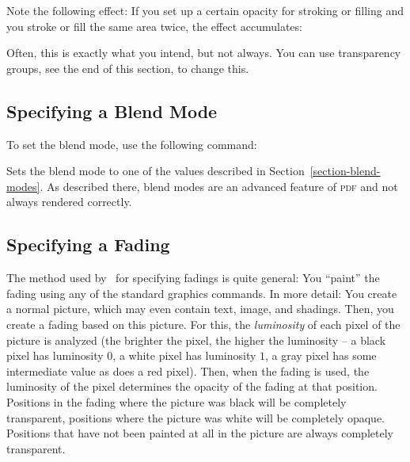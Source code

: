 Note the following effect: If you set up a certain opacity for stroking or
filling and you stroke or fill the same area twice, the effect accumulates:
%
\begin{codeexample}[]
\end{codeexample}

Often, this is exactly what you intend, but not always. You can use
transparency groups, see the end of this section, to change this.


\subsection{Specifying a Blend Mode}

To set the blend mode, use the following command:

\begin{command}{\pgfsetblendmode{}}
    Sets the blend mode to one of the values described in
    Section~\ref{section-blend-modes}. As described there, blend modes are an
    advanced feature of \textsc{pdf} and not always rendered correctly.
\begin{codeexample}[]
\end{codeexample}
\end{command}


\subsection{Specifying a Fading}

The method used by \pgfname\ for specifying fadings is quite general: You
``paint'' the fading using any of the standard graphics commands. In more
detail: You create a normal picture, which may even contain text, image, and
shadings. Then, you create a fading based on this picture. For this, the
\emph{luminosity} of each pixel of the picture is analyzed (the brighter the
pixel, the higher the luminosity -- a black pixel has luminosity $0$, a white
pixel has luminosity $1$, a gray pixel has some intermediate value as does a
red pixel). Then, when the fading is used, the luminosity of the pixel
determines the opacity of the fading at that position. Positions in the fading
where the picture was black will be completely transparent, positions where the
picture was white will be completely opaque. Positions that have not been
painted at all in the picture are always completely transparent.

